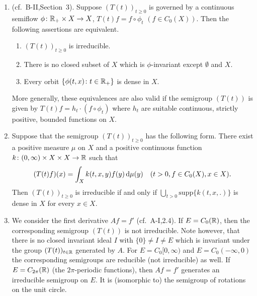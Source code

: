 \begin{examples}\label{ex:b3-3.4}
%
	
\begin{enumerate}[\upshape (i), wide, labelindent=.5em]
	\item 
	(cf.\ B-II,Section~3). Suppose $(T(t))_{t\geq 0}$ is governed by a continuous semiflow $\phi \colon \mathbb{R}_{+} \times X \to X$, \ie $T(t)f = f\circ\phi_{t}$ $(f\in C_{0}(X))$.
	Then the following assertions are equivalent.
	\begin{enumerate}[\upshape (a)]
		\item 
		$(T(t))_{t\geq 0}$ is irreducible.
	
		\item 
		There is no closed subset of $X$ which is $\phi$-invariant except $\emptyset$ and $X$.
	
		\item 
		Every orbit $\{\phi(t,x) \colon t \in \mathbb{R}_{+}\}$ is dense in $X$.
	\end{enumerate}
	More generally, these equivalences are also valid if the semigroup $(T(t))$ is given by $T(t)f = h_{t}\cdot(f\circ\phi_{t})$ where $h_{t}$ are suitable continuous, strictly positive, bounded functions on $X$.
	
	\item 
	Suppose that the semigroup $(T(t))_{t\geq 0}$ has the following form. 
    There exist a positive measure $\mu$ on $X$ and a positive continuous function $k \colon (0,\infty) \times X \times X \to \mathbb{R}$ such that
	\begin{equation}\label{eq:b3-3.1}
		(T(t)f)(x) = \int_{X} k(t,x,y)f(y) \mathop{}\!\mathrm{d}{\mu}(y) \quad (t > 0, f \in C_{0}(X), x \in X).		
	\end{equation}	
	Then $(T(t))_{t\geq 0}$ is irreducible if and only if $\bigcup_{t>0}\text{supp}\{k(t,x,.)\}$ is dense in $X$ for every $x \in X$.
	
	\item 
	We consider the first derivative $Af = f'$ (cf.\ A-I,2.4). 
    If $E = C_{0}(\mathbb{R})$, then the corresponding semigroup $(T(t))$ is not irreducible.
	Note however, that there is no closed invariant ideal $I$ with $\{0\} \neq I \neq E$ which is invariant under the group $(T(t))_{t\in\mathbb{R}}$ generated by $A$.
	For $E = C_{0}[0,\infty)$ and $E = C_{0}(-\infty,0)$ the corresponding semigroups are reducible (\ie not irreducible) as well.
	If $E = C_{2\pi}(\mathbb{R})$ (\ie the $2\pi$-periodic functions), then $Af = f'$ generates an irreducible semigroup on $E$.
	It is (isomorphic to) the semigroup of rotations on the unit circle.
    

\end{enumerate}
\end{examples}
